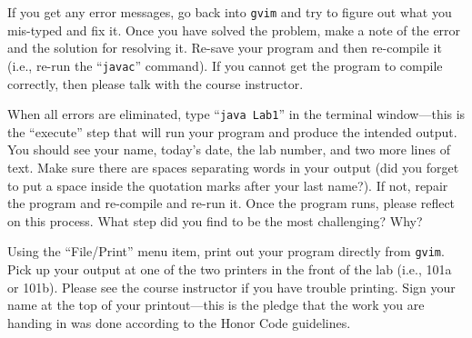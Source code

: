 
If you get any error messages, go back into {\tt gvim} and try to figure out what you mis-typed and fix it. Once you
have solved the problem, make a note of the error and the solution for resolving it. Re-save your program and then
re-compile it (i.e., re-run the ``{\tt javac}'' command). If you cannot get the program to compile correctly, then
please talk with the course instructor.

When all errors are eliminated, type ``{\tt java Lab1}'' in the terminal window---this is the ``execute'' step that will run
your program and produce the intended output.  You should see your name, today's date, the lab number, and two more
lines of text. Make sure there are spaces separating words in your output (did you forget to put a space inside the
  quotation marks after your last name?). If not, repair the program and re-compile and re-run it.  Once the program
runs, please reflect on this process.  What step did you find to be the most challenging? Why?




Using the ``File/Print'' menu item, print out your program directly from {\tt gvim}. Pick up your output at one of the
two printers in the front of the lab (i.e., 101a or 101b).  Please see the course instructor if you have trouble
printing.  Sign your name at the top of your printout---this is the pledge that the work you are handing in was done
according to the Honor Code guidelines.

